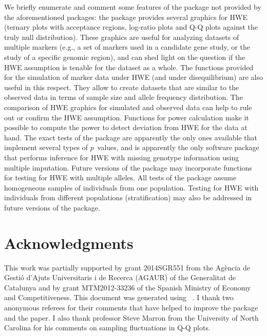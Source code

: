 \documentclass[nojss]{jss}
\begin{document}
We briefly enumerate and comment some features of the
 package not provided by the aforementioned
 packages: the package provides several graphics for HWE
(ternary plots with acceptance regions, log-ratio plots and Q-Q plots
against the truly null distribution). These graphics are useful for
analyzing datasets of multiple markers (e.g., a set of markers used in
a candidate gene study, or the study of a specific genomic region),
and can shed light on the question if the HWE assumption is tenable
for the dataset as a whole. The functions provided for the simulation
of marker data under HWE (and under disequilibrium) are also useful in
this respect. They allow to create datasets that are similar to the
observed data in terms of sample size and allele frequency
distribution. The comparison of HWE graphics for simulated and
observed data can help to rule out or confirm the HWE
assumption. Functions for power calculation make it possible to
compute the power to detect deviation from HWE for the data at
hand. The exact tests of the package are apparently the only ones
available that implement several types of $p$~values, and
 is apparently the only software package that performs
inference for HWE with missing genotype information using multiple
imputation. Future versions of the package may incorporate functions
for testing for HWE with multiple alleles. All tests of the package
assume homogeneous samples of individuals from one population. Testing
for HWE with individuals from different populations (stratification)
may also be addressed in future versions of the package.

\section*{Acknowledgments}

This work was partially supported by grant 2014SGR551 from the 
Ag\`encia de Gesti\'o d'Ajuts Universitaris i de Recerca (AGAUR) of the 
Generalitat de Catalunya and by grant MTM2012-33236 of the 
Spanish Ministry of Economy and Competitiveness.
This
document was generated using ~\citep{Leisch}. I thank two anonymous
referees for their comments that have helped to improve the package
and the paper. I also thank professor Steve Marron from the University
of North Carolina for his comments on sampling fluctuations in Q-Q
plots.


\end{document}
